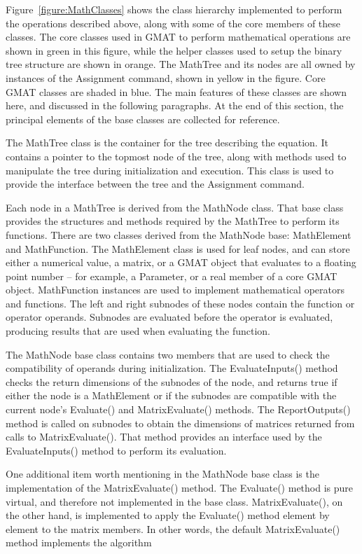 Figure~\ref{figure:MathClasses} shows the class hierarchy implemented to
perform the operations described above, along with some of the core members of
these classes.  The core classes used in GMAT to perform mathematical
operations are shown in green in this figure, while the helper classes used to
setup the binary tree structure are shown in orange.  The MathTree and its
nodes are all owned by instances of the Assignment command, shown in yellow in
the figure.  Core GMAT classes are shaded in blue.  The main features of these
classes are shown here, and discussed in the following paragraphs.  At the end
of this section, the principal elements of the base classes are collected for
reference.

The MathTree class is the container for the tree describing the equation.  It
contains a pointer to the topmost node of the tree, along with methods used to
manipulate the tree during initialization and execution.  This class is used to provide the
interface between the tree and the Assignment command.

Each node in a MathTree is derived from the MathNode class.  That base class
provides the structures and methods required by the MathTree to perform its
functions.  There are two classes derived from the MathNode base: MathElement
and MathFunction.  The MathElement class is used for leaf nodes, and can store
either a numerical value, a matrix, or a GMAT object that evaluates to a
floating point number -- for example, a Parameter, or a real member of a core
GMAT object.  MathFunction instances are used to implement mathematical
operators and functions.  The left and right subnodes of these nodes contain
the function or operator operands.  Subnodes are evaluated before the operator
is evaluated, producing results that are used when evaluating the function.

The MathNode base class contains two members that are used to check the
compatibility of operands during initialization.  The EvaluateInputs() method
checks the return dimensions of the subnodes of the node, and returns true if
either the node is a MathElement or if the subnodes are compatible with the
current node's Evaluate() and MatrixEvaluate() methods.  The ReportOutputs()
method is called on subnodes to obtain the dimensions of matrices returned from calls to
MatrixEvaluate().  That method provides an interface used by the
EvaluateInputs() method to perform its evaluation.

One additional item worth mentioning in the MathNode base class is the
implementation of the MatrixEvaluate() method.  The Evaluate() method is pure
virtual, and therefore not implemented in the base class.  MatrixEvaluate(), on the other hand, is
implemented to apply the Evaluate() method element by
element to the matrix members.  In other words, the default MatrixEvaluate()
method implements the algorithm

